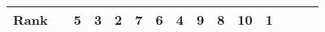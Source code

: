 \begin{tabular}{ll|rrrrrrrrr|rrrr}


  


  
  Rank & &
  5 & 3 & 2 & 7 & 6 & 4 & 9 & 8 & 10 & 1 &  &  &  \\\hline\hline
\end{tabular}


